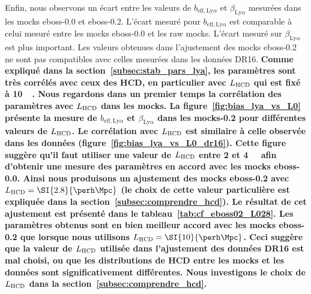 Enfin, nous observons un écart entre les valeurs de $b_{\mathrm{eff},\mathrm{Ly}\alpha}$ et $\beta_{\mathrm{Ly}\alpha}$ mesurées dans les mocks eboss-0.0 et eboss-0.2. L'écart mesuré pour $b_{\mathrm{eff},\mathrm{Ly}\alpha}$ est comparable à celui mesuré entre les mocks eboss-0.0 et les raw mocks.
L'écart mesuré sur $\beta_{\mathrm{Ly}\alpha}$ est plus important. Les valeurs obtenues dans l'ajustement des mocks eboss-0.2 ne sont pas compatibles avec celles mesurées dans les données DR16.
\textbf{Comme expliqué dans la section~\ref{subsec:stab_pars_lya}, les paramètres \lya{} sont très corrélés avec ceux des HCD, en particulier avec $L_{\textsc{HCD}}$ qui est fixé à \SI{10}{\perh\Mpc}.
Nous regardons dans un premier temps la corrélation des paramètres \lya{} avec $L_{\textsc{HCD}}$ dans les mocks. La figure~\ref{fig:bias_lya_vs_L0} présente la mesure de $b_{\mathrm{eff},\mathrm{Ly}\alpha}$ et $\beta_{\mathrm{Ly}\alpha}$ dans les mocks-0.2 pour différentes valeurs de $L_{\textsc{HCD}}$. Le corrélation avec $L_{\textsc{HCD}}$ est similaire à celle observée dans les données (figure~\ref{fig:bias_lya_vs_L0_dr16}).
Cette figure suggère qu'il faut utiliser une valeur de $L_{\textsc{HCD}}$ entre 2 et \SI{4}{\perh\Mpc} afin d'obtenir une mesure des paramètres \lya{} en accord avec les mocks eboss-0.0.
Ainsi nous produisons un ajustement des mocks eboss-0.2 avec $L_{\textsc{HCD}} = \SI{2.8}{\perh\Mpc}$ (le choix de cette valeur particulière est expliquée dans la section~\ref{subsec:comprendre_hcd}).
Le résultat de cet ajustement est présenté dans le tableau~\ref{tab:cf_eboss02_L028}.
Les paramètres \lya{} obtenus sont en bien meilleur accord avec les mocks eboss-0.2 que lorsque nous utilisons $L_{\textsc{HCD}} = \SI{10}{\perh\Mpc}$.
Ceci suggère que la valeur de $L_{\textsc{HCD}}$ utilisée dans l'ajustement des données DR16 est mal choisi, ou que les distributions de HCD entre les mocks et les données sont significativement différentes. Nous investigons le choix de $L_{\textsc{HCD}}$ dans la section~\ref{subsec:comprendre_hcd}.
}

